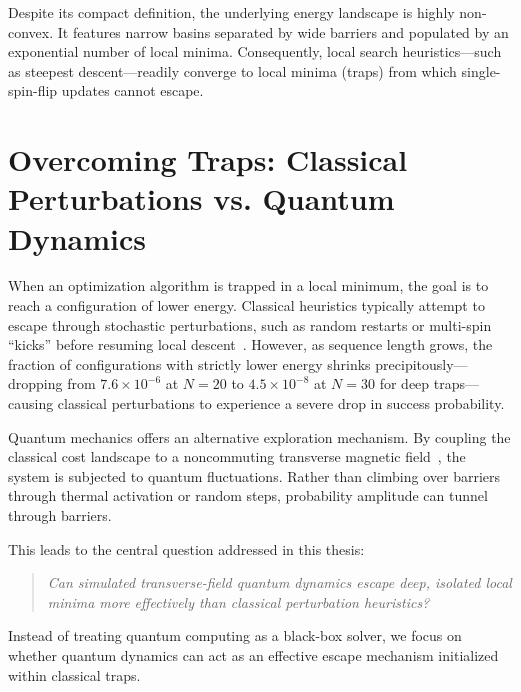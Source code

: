 \documentclass[12pt,a4paper]{report}
\begin{document}
Despite its compact definition, the underlying energy landscape is highly non-convex. It features narrow basins separated by wide barriers and populated by an exponential number of local minima. Consequently, local search heuristics---such as steepest descent---readily converge to local minima (traps) from which single-spin-flip updates cannot escape.

\section{Overcoming Traps: Classical Perturbations vs. Quantum Dynamics}
\label{sec:problem_and_hypothesis}
When an optimization algorithm is trapped in a local minimum, the goal is to reach a configuration of lower energy. Classical heuristics typically attempt to escape through stochastic perturbations, such as random restarts or multi-spin ``kicks'' before resuming local descent~\cite{marti2003}. However, as sequence length grows, the fraction of configurations with strictly lower energy shrinks precipitously---dropping from $7.6 \times 10^{-6}$ at $N = 20$ to $4.5 \times 10^{-8}$ at $N = 30$ for deep traps---causing classical perturbations to experience a severe drop in success probability.

Quantum mechanics offers an alternative exploration mechanism. By coupling the classical cost landscape to a noncommuting transverse magnetic field~\cite{kadowaki1998}, the system is subjected to quantum fluctuations. Rather than climbing over barriers through thermal activation or random steps, probability amplitude can tunnel through barriers.

This leads to the central question addressed in this thesis:
\begin{quote}
    \textit{Can simulated transverse-field quantum dynamics escape deep, isolated local minima more effectively than classical perturbation heuristics?}
\end{quote}

Instead of treating quantum computing as a black-box solver, we focus on whether quantum dynamics can act as an effective escape mechanism initialized within classical traps.
\end{document}
